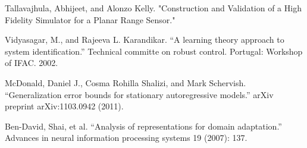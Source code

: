 \documentclass[a4paper, 11pt]{article}
\begin{document}
\begin{thebibliography}{99}
Tallavajhula, Abhijeet, and Alonzo Kelly. "Construction and Validation of a High
Fidelity Simulator for a Planar Range Sensor."

Vidyasagar, M., and Rajeeva L. Karandikar. ``A learning theory approach to
system identification.'' Technical committe on robust control. Portugal:
Workshop of IFAC. 2002.

McDonald, Daniel J., Cosma Rohilla Shalizi, and Mark Schervish. ``Generalization
error bounds for stationary autoregressive models.'' arXiv preprint
arXiv:1103.0942 (2011).

Ben-David, Shai, et al. ``Analysis of representations for domain adaptation.''
Advances in neural information processing systems 19 (2007): 137.
\end{thebibliography}
\end{document}
